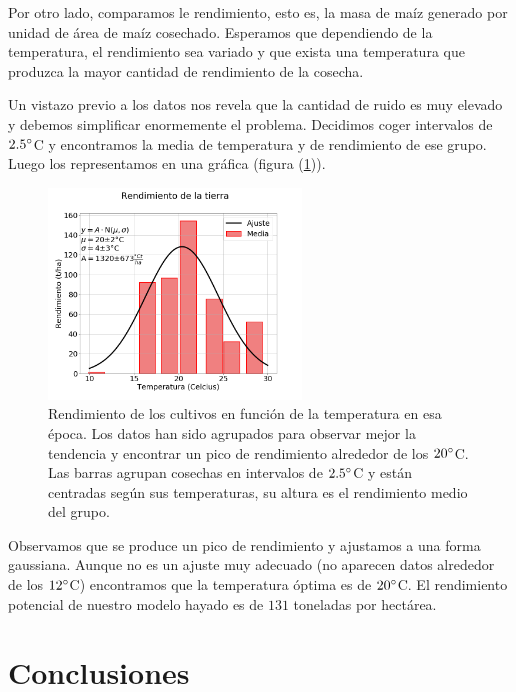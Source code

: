 \documentclass[12pt, spanish]{article}
\begin{document}
Por otro lado, comparamos le rendimiento, esto es, la masa de maíz generado por unidad de área de maíz cosechado. Esperamos que dependiendo de la temperatura, el rendimiento sea variado y que exista una temperatura que produzca la mayor cantidad de rendimiento de la cosecha.

Un vistazo previo a los datos nos revela que la cantidad de ruido es muy elevado y debemos simplificar enormemente el problema. Decidimos coger intervalos de $2.5\degree$C y encontramos la media de temperatura y de rendimiento de ese grupo. Luego los representamos en una gráfica (figura (\ref{fig:rendimiento})).
\newpage
\begin{figure}
    \centering
	\includegraphics[width=0.6\textwidth]{figures/rendimiento.png} %
	\caption{Rendimiento de los cultivos en función de la temperatura en esa época. Los datos han sido agrupados para observar mejor la tendencia y encontrar un pico de rendimiento alrededor de los $20\degree$C. Las barras agrupan cosechas en intervalos de $2.5\degree$C y están centradas según sus temperaturas, su altura es el rendimiento medio del grupo.}
	\label{fig:rendimiento}
\end{figure}

Observamos que se produce un pico de rendimiento y ajustamos a una forma gaussiana. Aunque no es un ajuste muy adecuado (no aparecen datos alrededor de los $12\degree$C) encontramos que la temperatura óptima es de $20\degree$C. 
El rendimiento potencial de nuestro modelo hayado es de $131$ toneladas por hectárea.



\section{Conclusiones}
\end{document}
